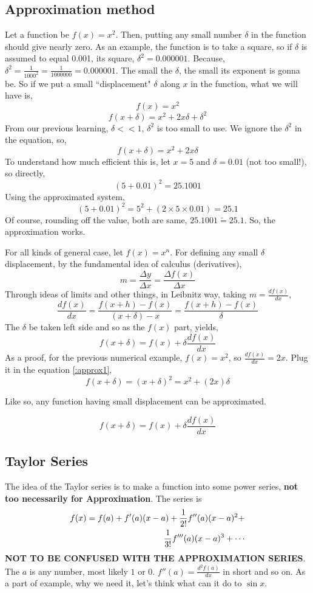 \documentclass[11pt,a4paper,landscape,twocolumn]{article}
\theoremstyle{definition}
\theoremstyle{definition}
\theoremstyle{definition}
\theoremstyle{definition}
\begin{document}
\subsection{\small{Approximation method}}
Let a function be $f(x) = x^2 $. Then, putting any small number $\delta$ in the function should give nearly zero. As an example, the function is to take a square, so if $\delta$ is assumed to equal 0.001, its square, $ \delta^2 = 0.000001 $. Because, $ \delta ^2 = \frac{1}{1000^2} = \frac{1}{1000000} = 0.000001 $. The small the $\delta$, the small its exponent is gonna be. So if we put a small ``displacement" $\delta$ along $x$ in the function, what we will have is,
\[ f(x)= x^2 \]
\[ f(x + \delta ) = x^2 + 2x\delta + \delta^2 \]
From our previous learning, $\delta << 1  $, $\delta ^2$ is too small to use. We ignore the $\delta^2$ in the equation, so,
\[ f(x + \delta) = x^2 +2x \delta \]
To understand how much efficient this is, let $ x =5 $ and $ \delta = 0.01$ (not too small!), so directly,
\[ (5 + 0.01)^2 = 25.1001 \]
Using the approximated system, 
\[ (5 + 0.01)^2 = 5^2 + ( 2 \times 5 \times 0.01 ) = 25.1 \]
Of course, rounding off the value, both are same, $25.1001 \tilde{=} 25.1$. So, the approximation works.


For all kinds of general case, let $f(x) = x^n $. For defining any small $\delta$ displacement, by the fundamental idea of calculus (derivatives),
\[ m = \frac{\Delta y}{\Delta x} = \frac{\Delta f(x)}{\Delta x}\] 
Through ideas of limits and other things, in Leibnitz way, taking $m = \frac{d f(x)}{dx}$,
\[ \frac{d f(x)}{dx} = \frac{ f(x + h) - f(x) }{(x + \delta) - x} = \frac{ f(x + h) - f(x) }{\delta}\]
The $\delta$ be taken left side and so as the $f(x)$ part, yields,
\begin{equation} \label{:approx1}
f(x+\delta) = f(x) + \delta \frac{d f(x)}{dx} 
\end{equation}
As a proof, for the previous numerical example, $f(x) = x^2 $, so $ \frac{d f(x)}{dx} = 2x $. Plug it in the equation \ref{:approx1},
\[ f(x + \delta) = (x + \delta)^2 = x^2 + ( 2x) \delta \]


Like so, any function having small displacement can be approximated. 

\begin{equation}
f(x + \delta) = f(x) + \delta \frac{df(x)}{dx}  
\end{equation}

\subsection{\small{Taylor Series}}
The idea of the Taylor series is to make a function into some power series, \textbf{not too necessarily for Approximation}. The series is 
\begin{align}
f(x) = f(a) + f'(a) (x - a) + \frac{1}{2!} f''(a) (x - a)^2 + \notag \\
 \frac{1}{3!} f'''(a) (x-a)^3 + \cdots
\end{align}
\textbf{NOT TO BE CONFUSED WITH THE APPROXIMATION SERIES}. The $a$ is any number, most likely $1$ or $0$. $f''(a) = \frac{d^2 f(a)}{dx}$ in short and so on. As a part of example, why we need it, let's think what can it do to $\sin x$.
\end{document}
